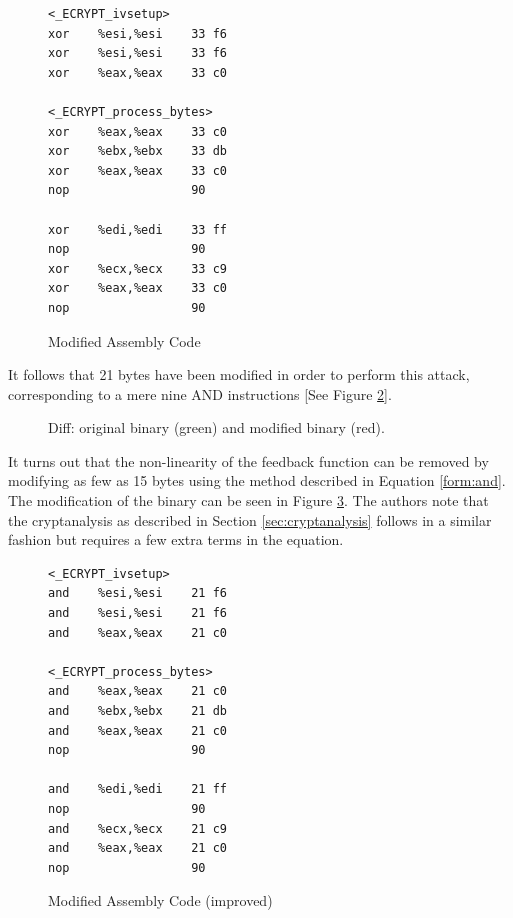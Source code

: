 \documentclass[conference]{IEEEtran}
\begin{document}
\begin{figure}[H]
\begin{lstlisting}[style=asm, frame=tlrb]
<_ECRYPT_ivsetup>
xor    %esi,%esi    33 f6
xor    %esi,%esi    33 f6
xor    %eax,%eax    33 c0

<_ECRYPT_process_bytes>
xor    %eax,%eax    33 c0
xor    %ebx,%ebx    33 db 
xor    %eax,%eax    33 c0
nop                 90

xor    %edi,%edi    33 ff
nop                 90
xor    %ecx,%ecx    33 c9
xor    %eax,%eax    33 c0
nop                 90
\end{lstlisting}
\caption{Modified Assembly Code}\label{fig:mod-asm}
\end{figure}

It follows that 21 bytes have been modified in order to perform this attack, corresponding to a mere nine AND instructions [See Figure \ref{fig:diff}].

\begin{figure}[H]
\centering
{}
\caption{Diff: original binary (green) and modified binary (red).}
\label{fig:diff}
\end{figure}

It turns out that the non-linearity of the feedback function can be removed by modifying as few as 15 bytes using the method described in Equation \ref{form:and}. The modification of the binary can be seen in Figure \ref{fig:mod-asm-imp}. The authors note that the cryptanalysis as described in Section \ref{sec:cryptanalysis} follows in a similar fashion but requires a few extra terms in the equation.

\begin{figure}[H]
\begin{lstlisting}[style=asm, frame=tlrb]
<_ECRYPT_ivsetup>
and    %esi,%esi    21 f6
and    %esi,%esi    21 f6
and    %eax,%eax    21 c0

<_ECRYPT_process_bytes>
and    %eax,%eax    21 c0
and    %ebx,%ebx    21 db 
and    %eax,%eax    21 c0
nop                 90

and    %edi,%edi    21 ff
nop                 90
and    %ecx,%ecx    21 c9
and    %eax,%eax    21 c0
nop                 90
\end{lstlisting}
\caption{Modified Assembly Code (improved)}\label{fig:mod-asm-imp}
\end{figure}
\end{document}
